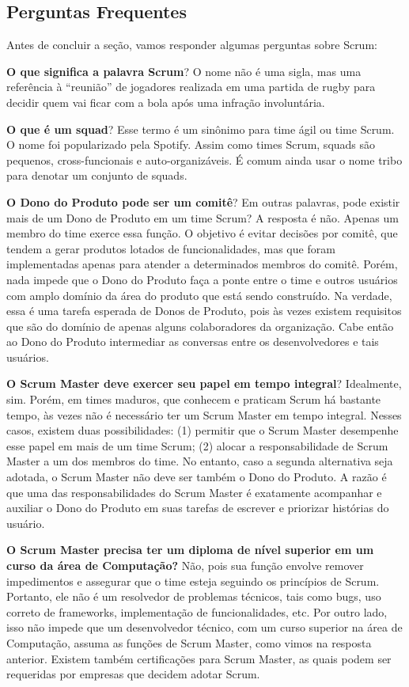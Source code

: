 \documentclass[
  11pt,
  twoside]{book}
\begin{document}
\hypertarget{perguntas-frequentes-1}{%
\subsection{Perguntas Frequentes}\label{perguntas-frequentes-1}}

Antes de concluir a seção, vamos responder algumas perguntas sobre
Scrum:

\textbf{O que significa a palavra Scrum}? O nome não é uma sigla, mas
uma referência à ``reunião'' de jogadores realizada em uma partida de
rugby para decidir quem vai ficar com a bola após uma infração
involuntária.

 \textbf{O que é um squad}? Esse termo é um sinônimo para
time ágil ou time Scrum. O nome foi popularizado pela Spotify. Assim
como times Scrum, squads são pequenos, cross-funcionais e
auto-organizáveis. É comum ainda usar o nome tribo para denotar um
conjunto de squads.

\textbf{O Dono do Produto pode ser um comitê}? Em outras palavras, pode
existir mais de um Dono de Produto em um time Scrum? A resposta é não.
Apenas um membro do time exerce essa função. O objetivo é evitar
decisões por comitê, que tendem a gerar produtos lotados de
funcionalidades, mas que foram implementadas apenas para atender a
determinados membros do comitê. Porém, nada impede que o Dono do Produto
faça a ponte entre o time e outros usuários com amplo domínio da área do
produto que está sendo construído. Na verdade, essa é uma tarefa
esperada de Donos de Produto, pois às vezes existem requisitos que são
do domínio de apenas alguns colaboradores da organização. Cabe então ao
Dono do Produto intermediar as conversas entre os desenvolvedores e tais
usuários.

 \textbf{O Scrum Master deve exercer seu papel
em tempo integral}? Idealmente, sim. Porém, em times maduros, que
conhecem e praticam Scrum há bastante tempo, às vezes não é necessário
ter um Scrum Master em tempo integral. Nesses casos, existem duas
possibilidades: (1) permitir que o Scrum Master desempenhe esse papel em
mais de um time Scrum; (2) alocar a responsabilidade de Scrum Master a
um dos membros do time. No entanto, caso a segunda alternativa seja
adotada, o Scrum Master não deve ser também o Dono do Produto. A razão é
que uma das responsabilidades do Scrum Master é exatamente acompanhar e
auxiliar o Dono do Produto em suas tarefas de escrever e priorizar
histórias do usuário.

\textbf{O Scrum Master precisa ter um diploma de nível superior em um
curso da área de Computação?} Não, pois sua função envolve remover
impedimentos e assegurar que o time esteja seguindo os princípios de
Scrum. Portanto, ele não é um resolvedor de problemas técnicos, tais
como bugs, uso correto de frameworks, implementação de funcionalidades,
etc. Por outro lado, isso não impede que um desenvolvedor técnico, com
um curso superior na área de Computação, assuma as funções de Scrum
Master, como vimos na resposta anterior. Existem também certificações
para Scrum Master, as quais podem ser requeridas por empresas que
decidem adotar Scrum.
\end{document}
